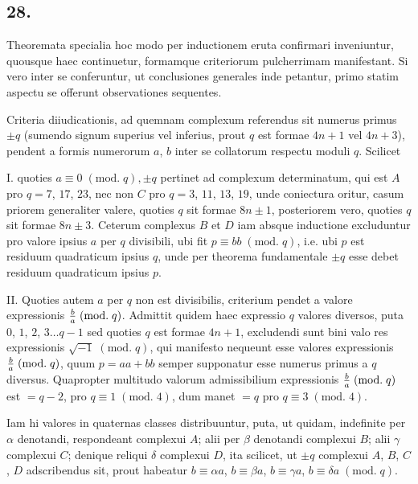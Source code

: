 \documentclass[twoside,12pt]{memoir}
\renewcommand{\pmod}[1]{\;(\textrm{mod.}\;#1)}
\let\oldfrac\frac
\def\frac#1#2{\mathchoice{\tfrac{#1}{#2}}{\oldfrac{#1}{#2}}{\genfrac{}{}{}{2}{#1}{#2\mathstrut}}{\genfrac{}{}{}{3}{#1}{#2\mathstrut}}}
\begin{document}
\subsection*{28.}
 
Theoremata specialia hoc modo per inductionem eruta confirmari inveniuntur, quousque haec continuetur, formamque criteriorum pulcherrimam manifestant. Si vero inter se conferuntur, ut conclusiones generales inde petantur, primo statim aspectu se offerunt observationes sequentes.

Criteria diiudicationis, ad quemnam complexum referendus sit numerus primus \(\pm q\) (sumendo signum superius vel inferius, prout \(q\) est formae \(4 n+1\) vel \(4 n+3\)), pendent a formis numerorum \(a\), \(b\) inter se collatorum respectu moduli \(q\). Scilicet
 
I. quoties \(a \equiv 0\pmod{q}, \pm q\) pertinet ad complexum determinatum, qui est \(A\) pro \(q=7\), \(17\), \(23\), nec non \(C\) pro \(q=3\), \(11\), \(13\), \(19\), unde coniectura oritur, casum priorem generaliter valere, quoties \(q\) sit formae \(8 n \pm 1\), posteriorem vero, quoties \(q\) sit formae \(8 n \pm 3\). Ceterum complexus \(B\) et \(D\) iam absque inductione excluduntur pro valore ipsius \(a\) per \(q\) divisibili, ubi fit \(p \equiv b b \pmod{q}\), i.e. ubi \(p\) est residuum quadraticum ipsius \(q\), unde per theorema fundamentale \(\pm q\) esse debet residuum quadraticum ipsius \(p\).
 
II. Quoties autem \(a\) per \(q\) non est divisibilis, criterium pendet a valore expressionis \(\frac{b}{a}\pmod{q}\). Admittit quidem haec expressio \(q\) valores diversos, puta \(0\), \(1\), \(2\), \(3 \ldots q-1\) sed quoties \(q\) est formae \(4 n+1\), excludendi sunt bini valo\pagebreak%
res expressionis \(\surd{-1}\pmod{q}\), qui manifesto nequeunt esse valores expressionis \(\frac{b}{a}\pmod{q}\), quum \(p=a a+b b\) semper supponatur esse numerus primus a \(q\) diversus. Quapropter multitudo valorum admissibilium expressionis \(\frac{b}{a}\pmod{q}\) est \(=q-2\), pro \(q \equiv 1\pmod{4}\), dum manet \(=q\) pro \(q \equiv 3\pmod{4}\).

Iam hi valores in quaternas classes distribuuntur, puta, ut quidam, indefinite per \(\alpha\) denotandi, respondeant complexui \(A\); alii per \(\beta\) denotandi complexui \(B\); alii \(\gamma\) complexui \(C\); denique reliqui \(\delta\) complexui \(D\), ita scilicet, ut \(\pm q\) complexui \(A\), \(B\), \(C\), \(D\) adscribendus sit, prout habeatur \(b \equiv \alpha a\), \(b \equiv \beta a\), \(b \equiv \gamma a\), \(b \equiv \delta a\pmod{q}\).
\end{document}
